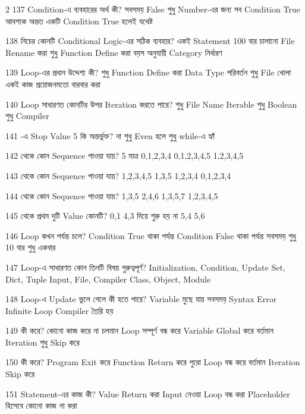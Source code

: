 \begin{multicols}{2}
\mcqwide
{137}
{Condition-এ  ব্যবহারের অর্থ কী?}
{সবসময় False}
{শুধু Number-এর জন্য}
{সব Condition True আবশ্যক}
{অন্তত একটি Condition True হলেই যথেষ্ট}

\mcqwide
{138}
{নিচের কোনটি Conditional Logic-এর সঠিক ব্যবহার?}
{একই Statement 100 বার চালানো}
{File Rename করা}
{শুধু Function Define করা}
{বয়স অনুযায়ী Category নির্ধারণ}

\mcqwide
{139}
{Loop-এর প্রধান উদ্দেশ্য কী?}
{শুধু Function Define করা}
{Data Type পরিবর্তন}
{শুধু File খোলা}
{একই কাজ প্রয়োজনমতো বারবার করা}

\mcq
{140}
{ Loop সাধারণত কোনটির উপর Iteration করতে পারে?}
{শুধু File Name}
{Iterable}
{শুধু Boolean}
{শুধু Compiler}

\mcq
{141}
{-এ Stop Value 5 কি অন্তর্ভুক্ত?}
{না}
{শুধু Even হলে}
{শুধু while-এ}
{হ্যাঁ}

\mcq
{142}
{ থেকে কোন Sequence পাওয়া যায়?}
{5 মাত্র}
{0,1,2,3,4}
{0,1,2,3,4,5}
{1,2,3,4,5}

\mcq
{143}
{ থেকে কোন Sequence পাওয়া যায়?}
{1,2,3,4,5}
{1,3,5}
{1,2,3,4}
{0,1,2,3,4}

\mcq
{144}
{ থেকে কোন Sequence পাওয়া যায়?}
{1,3,5}
{2,4,6}
{1,3,5,7}
{1,2,3,4,5}

\mcq
{145}
{ থেকে প্রথম দুটি Value কোনটি?}
{0,1}
{4,3 দিয়ে শুরু হয় না}
{5,4}
{5,6}

\mcqwide
{146}
{ Loop কখন পর্যন্ত চলে?}
{Condition True থাকা পর্যন্ত}
{Condition False থাকা পর্যন্ত সবসময়}
{শুধু 10 বার}
{শুধু একবার}

\mcqwide
{147}
{ Loop-এ সাধারণত কোন তিনটি বিষয় গুরুত্বপূর্ণ?}
{Initialization, Condition, Update}
{Set, Dict, Tuple}
{Input, File, Compiler}
{Class, Object, Module}

\mcq
{148}
{ Loop-এ Update ভুলে গেলে কী হতে পারে?}
{Variable মুছে যায়}
{সবসময় Syntax Error}
{Infinite Loop}
{Compiler তৈরি হয়}

\mcqwide
{149}
{ কী করে?}
{কোনো কাজ করে না}
{চলমান Loop সম্পূর্ণ বন্ধ করে}
{Variable Global করে}
{বর্তমান Iteration শুধু Skip করে}

\mcqwide
{150}
{ কী করে?}
{Program Exit করে}
{Function Return করে}
{পুরো Loop বন্ধ করে}
{বর্তমান Iteration Skip করে}

\mcqwide
{151}
{ Statement-এর কাজ কী?}
{Value Return করা}
{Input নেওয়া}
{Loop বন্ধ করা}
{Placeholder হিসেবে কোনো কাজ না করা}


\end{multicols}
